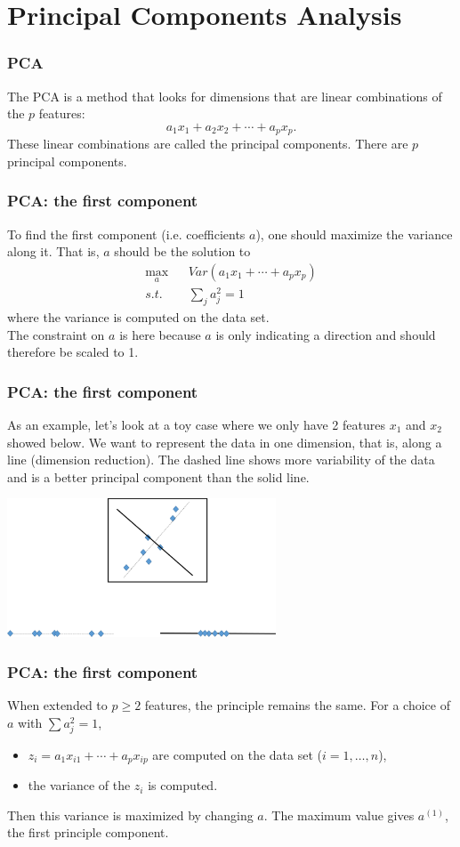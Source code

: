 \section{Principal Components Analysis}
\begin{frame}
\frametitle{PCA}
The PCA is a method that looks for dimensions that are linear combinations of the $p$ features:
$$
a_1 x_1 + a_2 x_2 + \cdots + a_p x_p.
$$
These linear combinations are called the principal components. There are $p$ principal components. 
\end{frame}
\begin{frame}
\frametitle{PCA: the first component}
To find the first component (i.e. coefficients $a$), one should maximize the variance along it. That is, $a$ should be the solution to 
\begin{eqnarray*}
\max_a &&Var (a_1 x_{1} + \cdots + a_p x_{p})\\
s.t.&& \sum_j a_j^2 = 1
\end{eqnarray*}
where the variance is computed on the data set.\\
\vspace{0.2cm}
The constraint on $a$ is here because $a$ is only indicating a direction and should therefore be scaled to 1. 
\end{frame}
\begin{frame}
\frametitle{PCA: the first component}
As an example, let's look at a toy case where we only have 2 features $x_1$ and $x_2$ showed below. We want to represent the data in one dimension, that is, along a line (dimension reduction). The dashed line shows more variability of the data and is a better principal component than the solid line.\\
\vspace{0.2cm}
\begin{center}
\includegraphics[width=8cm]{../../Graphs/PCA_Illustr.png}
\end{center}
\end{frame}
\begin{frame}
\frametitle{PCA: the first component}
When extended to $p\geq 2$ features, the principle remains the same. For a choice of $a$ with $\sum a_j^2=1$, 
\begin{itemize}
\item $z_i = a_1 x_{i1} + \cdots + a_p x_{ip}$ are computed on the data set ($i=1,\ldots,n$), \item the variance of the $z_i$ is computed.
\end{itemize}
Then this variance is maximized by changing $a$. The maximum value gives $a^{(1)}$, the first principle component.
\end{frame}
